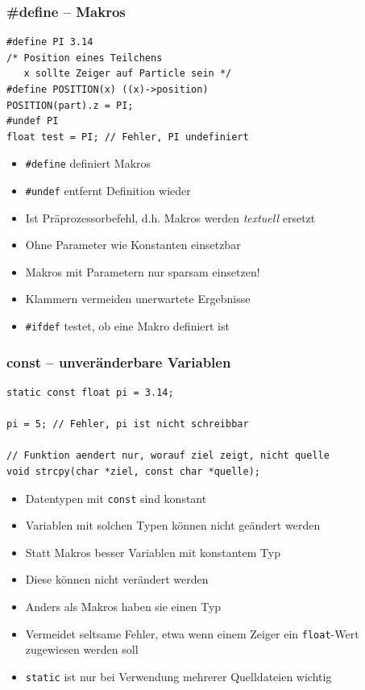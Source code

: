 \documentclass{slides}
\begin{document}
\begin{frame}[fragile]
  \frametitle{\#define -- Makros}
\begin{lstlisting}[emph=define]
#define PI 3.14
/* Position eines Teilchens
   x sollte Zeiger auf Particle sein */
#define POSITION(x) ((x)->position)
POSITION(part).z = PI;
#undef PI
float test = PI; // Fehler, PI undefiniert
\end{lstlisting}

  \begin{itemize}
  \item \lstinline!#define! definiert Makros
  \item \lstinline!#undef! entfernt Definition wieder
  \item Ist Präprozessorbefehl, d.h. Makros werden \emph{textuell} ersetzt
  \item Ohne Parameter wie Konstanten einsetzbar
  \item Makros mit Parametern nur sparsam einsetzen!
  \item Klammern vermeiden unerwartete Ergebnisse
  \item \lstinline!#ifdef! testet, ob eine Makro definiert ist
  \end{itemize}
\end{frame}

\begin{frame}[fragile]
  \frametitle{const -- unveränderbare Variablen}
\begin{lstlisting}[emph=const]
static const float pi = 3.14;

pi = 5; // Fehler, pi ist nicht schreibbar

// Funktion aendert nur, worauf ziel zeigt, nicht quelle
void strcpy(char *ziel, const char *quelle);
\end{lstlisting}

  \begin{itemize}
  \item Datentypen mit \lstinline!const! sind konstant
  \item Variablen mit solchen Typen können nicht geändert werden
  \item Statt Makros besser Variablen mit konstantem Typ
  \item Diese können nicht verändert werden
  \item Anders als Makros haben sie einen Typ
  \item Vermeidet seltsame Fehler, etwa wenn einem  Zeiger ein \lstinline!float!-Wert zugewiesen
    werden soll
  \item \lstinline!static! ist nur bei Verwendung mehrerer Quelldateien wichtig
  \end{itemize}
\end{frame}
\end{document}
